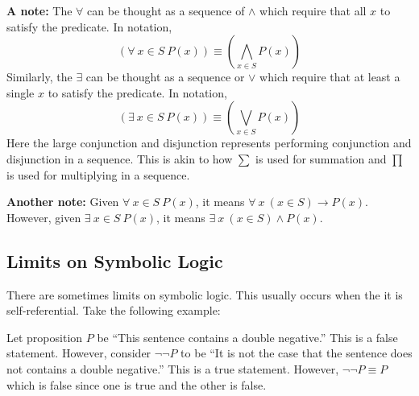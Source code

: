 \bigskip
\textbf{A note:} The \(\forall\) can be thought as a sequence of \(\land\) which require that all \(x\) to satisfy the predicate. In notation,
\[(\forall\:x\in S\:P(x))\equiv(\bigwedge_{x\in S}P(x))\]
Similarly, the \(\exists\) can be thought as a sequence or \(\lor\) which require that at least a single \(x\) to satisfy the predicate. In notation,
\[(\exists\:x\in S\:P(x))\equiv(\bigvee_{x\in S}P(x))\]
Here the large conjunction and disjunction represents performing conjunction and disjunction in a sequence. This is akin to how \(\sum\) is used for
summation and \(\prod\) is used for multiplying in a sequence.

\bigskip
\textbf{Another note:} Given \(\forall\:x\in S\:P(x)\), it means \(\forall\:x\:(x\in S)\rightarrow P(x)\). However, given \(\exists\:x\in S\:P(x)\),
it means \(\exists\:x\:(x\in S)\land P(x)\).

\bigskip
\subsection{Limits on Symbolic Logic}
There are sometimes limits on symbolic logic. This usually occurs when the it is self-referential. Take the following example:

Let proposition \(P\) be ``This sentence contains a double negative.'' This is a false statement. However, consider \(\lnot\lnot P\) to be
``It is not the case that the sentence does not contains a double negative.'' This is a true statement. However, \(\lnot\lnot P\equiv P\)
which is false since one is true and the other is false. 

